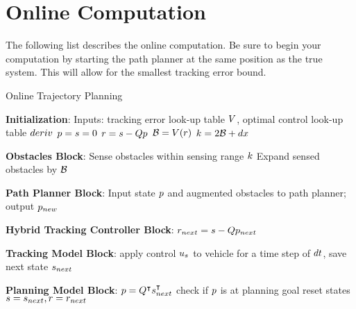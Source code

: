 \section{Online Computation \label{sec:online}}


The following list describes the online computation. Be sure to begin your computation by starting the path planner at the same position as the true system. This will allow for the smallest tracking error bound.

\begin{algorithm}[bp]
	
	\caption{Online Trajectory Planning}
	\label{alg:algOnline}
	\begin{algorithmic}[1]
		\STATE \textbf{Initialization}: \label{ln:Istart}
		\STATE Inputs: tracking error look-up table $V$, optimal control look-up table $deriv$
		\STATE $p = s = 0$
		\STATE $r = s - Qp$
		\STATE $\mathcal B = V(r)$
		\STATE $k = 2\mathcal B+dx$
		
		\STATE \textbf{Obstacles Block}:
		\STATE Sense obstacles within sensing range $k$
		\STATE Expand sensed obstacles by $\mathcal B$
		
		\STATE \textbf{Path Planner Block}:
		\STATE Input state $p$ and augmented obstacles to path planner; output $p_{new}$
		
		\STATE \textbf{Hybrid Tracking Controller Block}:
		\STATE $r_{next} = s - Qp_{next}$
		
		\ELSE {} \ENDIF
		
		\STATE \textbf{Tracking Model Block}:
		\STATE apply control $u_s$ to vehicle for a time step of $dt$, save next state $s_{next}$
		
		\STATE \textbf{Planning Model Block}:
		\STATE $p = Q^\intercal s_{next}^\intercal$
		\STATE check if $p$ is at planning goal
		\STATE reset states $s = s_{next}, r = r_{next}$
		\ENDWHILE
	\end{algorithmic}
\end{algorithm}


